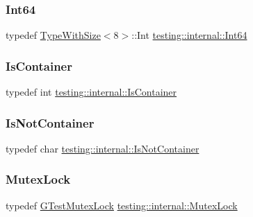 \mbox{\label{namespacetesting_1_1internal_a271c563fec38b804ddab0677f51f70a8}} 
\subsubsection{\texorpdfstring{Int64}{Int64}}
{\footnotesize\ttfamily typedef \mbox{\hyperlink{classtesting_1_1internal_1_1TypeWithSize}{Type\+With\+Size}}$<$8$>$\+::Int \mbox{\hyperlink{namespacetesting_1_1internal_a271c563fec38b804ddab0677f51f70a8}{testing\+::internal\+::\+Int64}}}

\mbox{\label{namespacetesting_1_1internal_ad8f0c2883245f1df2a53618a49f0deb3}} 
\subsubsection{\texorpdfstring{IsContainer}{IsContainer}}
{\footnotesize\ttfamily typedef int \mbox{\hyperlink{namespacetesting_1_1internal_ad8f0c2883245f1df2a53618a49f0deb3}{testing\+::internal\+::\+Is\+Container}}}

\mbox{\label{namespacetesting_1_1internal_abf080521ce135deb510e0a7830fd3d33}} 
\subsubsection{\texorpdfstring{IsNotContainer}{IsNotContainer}}
{\footnotesize\ttfamily typedef char \mbox{\hyperlink{namespacetesting_1_1internal_abf080521ce135deb510e0a7830fd3d33}{testing\+::internal\+::\+Is\+Not\+Container}}}

\mbox{\label{namespacetesting_1_1internal_a08b187c6cc4e28400aadf9a32fccc8de}} 
\subsubsection{\texorpdfstring{MutexLock}{MutexLock}}
{\footnotesize\ttfamily typedef \mbox{\hyperlink{classtesting_1_1internal_1_1GTestMutexLock}{G\+Test\+Mutex\+Lock}} \mbox{\hyperlink{namespacetesting_1_1internal_a08b187c6cc4e28400aadf9a32fccc8de}{testing\+::internal\+::\+Mutex\+Lock}}}

